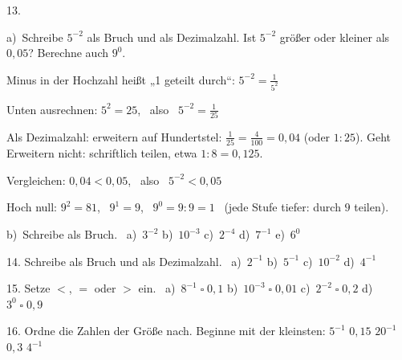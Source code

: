 \documentclass[11pt]{article}
\newcommand{\grau}[1]{{\color{mbgrau}#1}}
\begin{document}
\begin{pfaufg}{}{13.}{}
\grau{a)\ Schreibe $5^{-2}$ als Bruch und als Dezimalzahl. Ist $5^{-2}$ größer oder kleiner als $0{,}05$? Berechne auch $9^0$.\par\smallskip Minus in der Hochzahl heißt „1 geteilt durch“: \quad $5^{-2} = \frac{1}{5^2}$\par Unten ausrechnen: $5^2 = 25$, \ also \ $5^{-2} = \frac{1}{25}$\par Als Dezimalzahl: erweitern auf Hundertstel: \quad $\frac{1}{25} = \frac{4}{100} = 0{,}04$ \quad (oder $1 : 25$). Geht Erweitern nicht: schriftlich teilen, etwa $1 : 8 = 0{,}125$.\par Vergleichen: \quad $0{,}04 < 0{,}05$, \ also \ $5^{-2} < 0{,}05$\par Hoch null: $9^2 = 81$, \ $9^1 = 9$, \ $9^0 = 9 : 9 = 1$ \ (jede Stufe tiefer: durch $9$ teilen).}
\par\medskip
b)\ Schreibe als Bruch. \ a)~$3^{-2}$ \qquad b)~$10^{-3}$ \qquad c)~$2^{-4}$ \qquad d)~$7^{-1}$ \qquad e)~$6^0$
\end{pfaufg}

\begin{pfaufg}{}{14.}{}
Schreibe als Bruch und als Dezimalzahl. \ a)~$2^{-1}$ \qquad b)~$5^{-1}$ \qquad c)~$10^{-2}$ \qquad d)~$4^{-1}$
\end{pfaufg}

\begin{pfaufg}{}{15.}{}
Setze $<$, $=$ oder $>$ ein. \ a)~$8^{-1} \;\square\; 0{,}1$ \qquad b)~$10^{-3} \;\square\; 0{,}01$ \qquad c)~$2^{-2} \;\square\; 0{,}2$ \qquad d)~$3^0 \;\square\; 0{,}9$
\end{pfaufg}

\begin{pfaufg}{}{16.}{}
Ordne die Zahlen der Größe nach. Beginne mit der kleinsten: \quad $5^{-1}$ \qquad $0{,}15$ \qquad $20^{-1}$ \qquad $0{,}3$ \qquad $4^{-1}$
\end{pfaufg}
\end{document}
